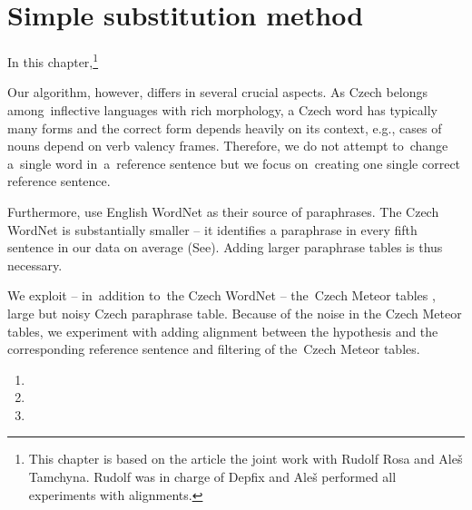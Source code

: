 \chapter{Simple substitution method}

In this chapter,\footnote{This chapter is based on the article 
\citep{barancikova:2014} the joint work with Rudolf Rosa and Ale\v{s} Tamchyna.
Rudolf was in charge of Depfix and Ale\v{s} performed all experiments with 
alignments. }

Our algorithm, however, differs in several crucial aspects. As Czech belongs 
among~inflective languages with rich morphology, a Czech word has typically 
many forms and the correct form depends heavily on its context, e.g., cases 
of nouns depend on verb valency frames. Therefore, we do not attempt to~change 
a~single word in~a~reference sentence but we focus on~creating one single correct 
reference sentence.

Furthermore, \citeauthor{kauchak} use English WordNet as their source of 
paraphrases. The Czech WordNet \citep{czech-wordnet} is substantially smaller 
-- it identifies a paraphrase in every fifth sentence in our data on average 
(See). Adding larger paraphrase tables is thus 
necessary. 

We exploit --  in~addition to~the Czech WordNet --  the~Czech Meteor 
tables \citep{meteor-tables}, large but noisy Czech paraphrase table. Because 
of the noise in the Czech Meteor tables, we experiment with adding alignment 
between the hypothesis and the corresponding reference sentence and filtering
of the~Czech Meteor tables.


\begin{enumerate}
\item {}
\item {}
\item {}
\end{enumerate}


